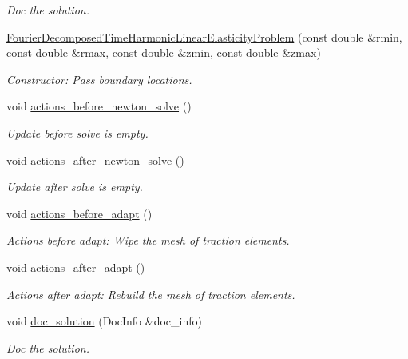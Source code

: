 \begin{DoxyCompactItemize}
\begin{DoxyCompactList}\small\item\em Doc the solution. \end{DoxyCompactList}\item 
\hyperlink{classFourierDecomposedTimeHarmonicLinearElasticityProblem_a6960b05a48af6837c9db919a01a34640}{Fourier\+Decomposed\+Time\+Harmonic\+Linear\+Elasticity\+Problem} (const double \&rmin, const double \&rmax, const double \&zmin, const double \&zmax)
\begin{DoxyCompactList}\small\item\em Constructor\+: Pass boundary locations. \end{DoxyCompactList}\item 
void \hyperlink{classFourierDecomposedTimeHarmonicLinearElasticityProblem_ad9a3f48c3b399c4595f73d3f1e9a14ef}{actions\+\_\+before\+\_\+newton\+\_\+solve} ()
\begin{DoxyCompactList}\small\item\em Update before solve is empty. \end{DoxyCompactList}\item 
void \hyperlink{classFourierDecomposedTimeHarmonicLinearElasticityProblem_ac5c25fb4658eaef91104ef7be1b0d25e}{actions\+\_\+after\+\_\+newton\+\_\+solve} ()
\begin{DoxyCompactList}\small\item\em Update after solve is empty. \end{DoxyCompactList}\item 
void \hyperlink{classFourierDecomposedTimeHarmonicLinearElasticityProblem_a36fdaec8cffb1f6ac313515a86010d8d}{actions\+\_\+before\+\_\+adapt} ()
\begin{DoxyCompactList}\small\item\em Actions before adapt\+: Wipe the mesh of traction elements. \end{DoxyCompactList}\item 
void \hyperlink{classFourierDecomposedTimeHarmonicLinearElasticityProblem_a5b9d18ea43b802e8a2b1f3b50140054b}{actions\+\_\+after\+\_\+adapt} ()
\begin{DoxyCompactList}\small\item\em Actions after adapt\+: Rebuild the mesh of traction elements. \end{DoxyCompactList}\item 
void \hyperlink{classFourierDecomposedTimeHarmonicLinearElasticityProblem_af328e5b2260377fa7df04b727ca130bd}{doc\+\_\+solution} (Doc\+Info \&doc\+\_\+info)
\begin{DoxyCompactList}\small\item\em Doc the solution. \end{DoxyCompactList}\end{DoxyCompactItemize}
